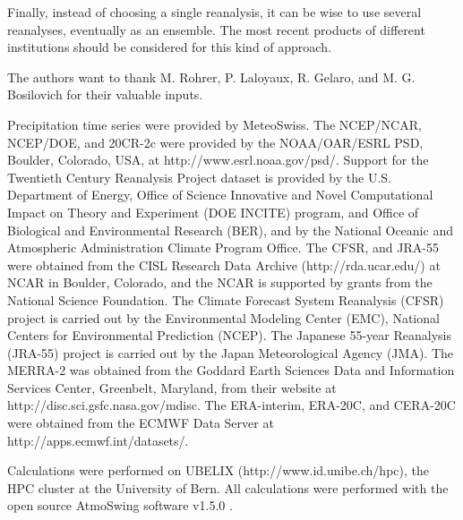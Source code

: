 \documentclass{ametsoc}
\begin{document}
Finally, instead of choosing a single reanalysis, it can be wise to use several reanalyses, eventually as an ensemble. The most recent products of different institutions should be considered for this kind of approach.





%
\acknowledgments
The authors want to thank M. Rohrer, P. Laloyaux, R. Gelaro, and M. G. Bosilovich for their valuable inputs.

Precipitation time series were provided by MeteoSwiss. The NCEP/NCAR, NCEP/DOE, and 20CR-2c were provided by the NOAA/OAR/ESRL PSD, Boulder, Colorado, USA, at http://www.esrl.noaa.gov/psd/. Support for the Twentieth Century Reanalysis Project dataset is provided by the U.S. Department of Energy, Office of Science Innovative and Novel Computational Impact on Theory and Experiment (DOE INCITE) program, and Office of Biological and Environmental Research (BER), and by the National Oceanic and Atmospheric Administration Climate Program Office. The CFSR, and JRA-55 were obtained from the CISL Research Data Archive (http://rda.ucar.edu/) at NCAR in Boulder, Colorado, and the NCAR is supported by grants from the National Science Foundation. The Climate Forecast System Reanalysis (CFSR) project is carried out by the Environmental Modeling Center (EMC), National Centers for Environmental Prediction (NCEP). The Japanese 55-year Reanalysis (JRA-55) project is carried out by the Japan Meteorological Agency (JMA). The MERRA-2 was obtained from the Goddard Earth Sciences Data and Information Services Center, Greenbelt, Maryland, from their website at http://disc.sci.gsfc.nasa.gov/mdisc. The ERA-interim, ERA-20C, and CERA-20C were obtained from the ECMWF Data Server at http://apps.ecmwf.int/datasets/. 

Calculations were performed on UBELIX (http://www.id.unibe.ch/hpc), the HPC cluster at the University of Bern. All calculations were performed with the open source AtmoSwing software v1.5.0 \citep{Horton2017a}.


%

\end{document}
